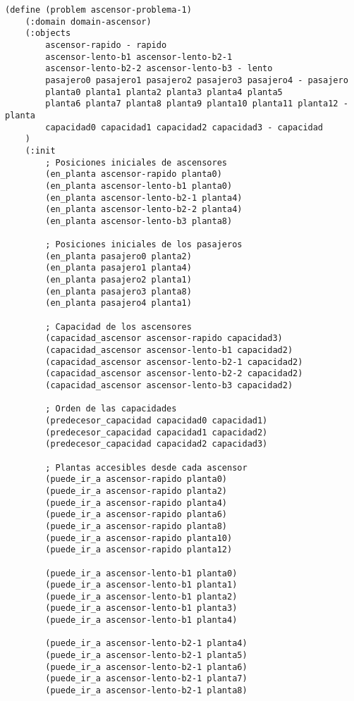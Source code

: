 \documentclass{article}
\begin{document}
\begin{verbatim}
(define (problem ascensor-problema-1)
    (:domain domain-ascensor)
    (:objects
        ascensor-rapido - rapido
        ascensor-lento-b1 ascensor-lento-b2-1 
        ascensor-lento-b2-2 ascensor-lento-b3 - lento
        pasajero0 pasajero1 pasajero2 pasajero3 pasajero4 - pasajero
        planta0 planta1 planta2 planta3 planta4 planta5 
        planta6 planta7 planta8 planta9 planta10 planta11 planta12 - planta
        capacidad0 capacidad1 capacidad2 capacidad3 - capacidad
    )
    (:init
        ; Posiciones iniciales de ascensores
        (en_planta ascensor-rapido planta0)
        (en_planta ascensor-lento-b1 planta0)
        (en_planta ascensor-lento-b2-1 planta4)
        (en_planta ascensor-lento-b2-2 planta4)
        (en_planta ascensor-lento-b3 planta8)

        ; Posiciones iniciales de los pasajeros
        (en_planta pasajero0 planta2)
        (en_planta pasajero1 planta4)
        (en_planta pasajero2 planta1)
        (en_planta pasajero3 planta8)
        (en_planta pasajero4 planta1)

        ; Capacidad de los ascensores
        (capacidad_ascensor ascensor-rapido capacidad3)
        (capacidad_ascensor ascensor-lento-b1 capacidad2)
        (capacidad_ascensor ascensor-lento-b2-1 capacidad2)
        (capacidad_ascensor ascensor-lento-b2-2 capacidad2)
        (capacidad_ascensor ascensor-lento-b3 capacidad2)

        ; Orden de las capacidades
        (predecesor_capacidad capacidad0 capacidad1)
        (predecesor_capacidad capacidad1 capacidad2)
        (predecesor_capacidad capacidad2 capacidad3)

        ; Plantas accesibles desde cada ascensor
        (puede_ir_a ascensor-rapido planta0)
        (puede_ir_a ascensor-rapido planta2)
        (puede_ir_a ascensor-rapido planta4)
        (puede_ir_a ascensor-rapido planta6)
        (puede_ir_a ascensor-rapido planta8)
        (puede_ir_a ascensor-rapido planta10)
        (puede_ir_a ascensor-rapido planta12)

        (puede_ir_a ascensor-lento-b1 planta0)
        (puede_ir_a ascensor-lento-b1 planta1)
        (puede_ir_a ascensor-lento-b1 planta2)
        (puede_ir_a ascensor-lento-b1 planta3)
        (puede_ir_a ascensor-lento-b1 planta4)

        (puede_ir_a ascensor-lento-b2-1 planta4)
        (puede_ir_a ascensor-lento-b2-1 planta5)
        (puede_ir_a ascensor-lento-b2-1 planta6)
        (puede_ir_a ascensor-lento-b2-1 planta7)
        (puede_ir_a ascensor-lento-b2-1 planta8)


\end{verbatim}
\end{document}

